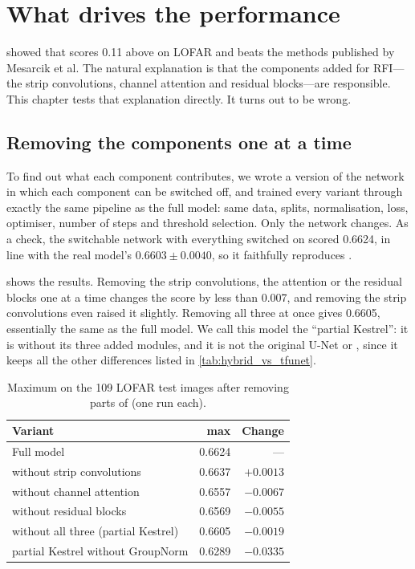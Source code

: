 \chapter{What drives the performance}
\label{ch:drivers}
 showed that \hybrid{} scores 0.11 above \tfunet{} on LOFAR and
beats the methods published by Mesarcik et al. The natural explanation is that the
components added for RFI---the strip convolutions, channel attention and
residual blocks---are responsible. This chapter tests that explanation
directly. It turns out to be wrong.

\section{Removing the components one at a time}
\label{sec:ablation}
To find out what each component contributes, we wrote a version of the network
in which each component can be switched off, and trained every variant
through exactly the same pipeline as the full model: same data, splits,
normalisation, loss, optimiser, number of steps and threshold selection. Only
the network changes. As a check, the switchable network with everything
switched on scored 0.6624, in line with the real model's $0.6603 \pm 0.0040$, so
it faithfully reproduces \hybrid{}.

 shows the results. Removing the strip convolutions,
the attention or the residual blocks one at a time changes the score by less
than 0.007, and removing the strip convolutions even raised it slightly.
Removing all three at once gives 0.6605, essentially the same as the full
model. We call this model the ``partial Kestrel'': it is \hybrid{} without its
three added modules, and it is not the original U-Net or \tfunet{}, since it
keeps all the other differences listed in \cref{tab:hybrid_vs_tfunet}.

\begin{table}[H]
  \centering
  \caption[Ablation of the network components (one seed)]{Maximum \Fone{}
    on the 109 LOFAR test images after removing parts of \hybrid{} (one run
    each).}
  \label{tab:ablation}
  \begin{tabular}{lrr}
    \toprule
    Variant & max \Fone{} & Change \\
    \midrule
    Full model                                   & 0.6624 & --- \\
    without strip convolutions                   & 0.6637 & $+0.0013$ \\
    without channel attention                    & 0.6557 & $-0.0067$ \\
    without residual blocks                      & 0.6569 & $-0.0055$ \\
    without all three (partial Kestrel)           & 0.6605 & $-0.0019$ \\
    partial Kestrel without GroupNorm             & 0.6289 & $-0.0335$ \\
    \bottomrule
  \end{tabular}
\end{table}

